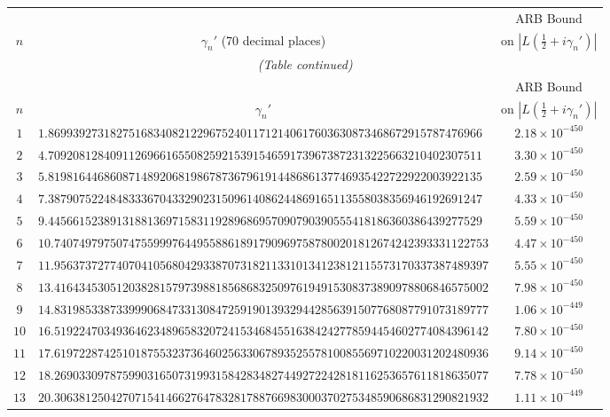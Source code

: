 \documentclass[12pt,reqno]{amsart}
\theoremstyle{remark}
\begin{document}
\renewcommand{\arraystretch}{1.1}
\setlength{\LTleft}{\fill}
\setlength{\LTright}{\fill}
\footnotesize
\begin{longtable}{clc}
\toprule
 & & ARB Bound \\
$n$ & \multicolumn{1}{c}{$\gamma_n'$ (70 decimal places)} & on $|L(\tfrac{1}{2}+i\gamma_n')|$ \\
\midrule
\endfirsthead
\multicolumn{3}{c}{\small\itshape (Table continued)} \\
\toprule
 & & ARB Bound \\
$n$ & \multicolumn{1}{c}{$\gamma_n'$} & on $|L(\tfrac{1}{2}+i\gamma_n')|$ \\
\midrule
\endhead
\bottomrule
\endlastfoot
$1$ & $1.8699392731827516834082122967524011712140617603630873468672915787476966$ & $2.18\times 10^{-450}$ \\
$2$ & $4.7092081284091126966165508259215391546591739673872313225663210402307511$ & $3.30\times 10^{-450}$ \\
$3$ & $5.8198164468608714892068198678736796191448686137746935422722922003922135$ & $2.59\times 10^{-450}$ \\
$4$ & $7.3879075224848333670433290231509614086244869165113558038356946192691247$ & $4.33\times 10^{-450}$ \\
$5$ & $9.4456615238913188136971583119289686957090790390555418186360386439277529$ & $5.59\times 10^{-450}$ \\
$6$ & $10.7407497975074755999764495588618917909697587800201812674242393331122753$ & $4.47\times 10^{-450}$ \\
$7$ & $11.9563737277407041056804293387073182113310134123812115573170337387489397$ & $5.55\times 10^{-450}$ \\
$8$ & $13.4164345305120382815797398818568683250976194915308373890978806846575002$ & $7.98\times 10^{-450}$ \\
$9$ & $14.8319853387339990684733130847259190139329442856391507768087791073189777$ & $1.06\times 10^{-449}$ \\
$10$ & $16.5192247034936462348965832072415346845516384242778594454602774084396142$ & $7.80\times 10^{-450}$ \\
$11$ & $17.6197228742510187553237364602563306789352557810085569710220031202480936$ & $9.14\times 10^{-450}$ \\
$12$ & $18.2690330978759903165073199315842834827449272242818116253657611818635077$ & $7.78\times 10^{-450}$ \\
$13$ & $20.3063812504270715414662764783281788766983000370275348590686831290821932$ & $1.11\times 10^{-449}$ \\

\end{longtable}
\end{document}

